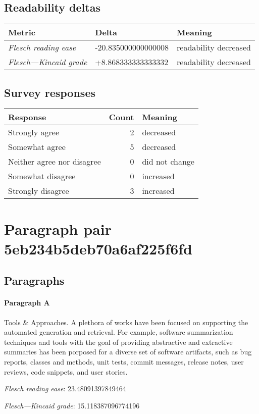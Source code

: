 \subsection{Readability deltas}

\begin{tabular}{lll}
\toprule
               \textbf{Metric} &       \textbf{Delta} &       \textbf{Meaning} \\
\midrule
    \emph{Flesch reading ease} &  -20.835000000000008 &  readability decreased \\
 \emph{Flesch---Kincaid grade} &   +8.868333333333332 &  readability decreased \\
\bottomrule
\end{tabular}

\subsection{Survey responses}
\begin{tabular}{lrl}
\toprule
          \textbf{Response} &  \textbf{Count} & \textbf{Meaning} \\
\midrule
             Strongly agree &               2 &        decreased \\
             Somewhat agree &               5 &        decreased \\
 Neither agree nor disagree &               0 &   did not change \\
          Somewhat disagree &               0 &        increased \\
          Strongly disagree &               3 &        increased \\
\bottomrule
\end{tabular}

\section{Paragraph pair 5eb234b5deb70a6af225f6fd}
\subsection{Paragraphs}
\paragraph{Paragraph A}
Tools \& Approaches. A plethora of works have been focused on supporting the automated generation and retrieval. For example, software summarization techniques and tools with the goal of providing abstractive and extractive summaries has been porposed for a diverse set of software artifacts, such as bug reports, classes and methods, unit tests, commit messages, release notes, user reviews, code snippets, and user stories.\par\medskip\emph{Flesch reading ease}: 23.48091397849464\par\emph{Flesch---Kincaid grade}: 15.118387096774196

